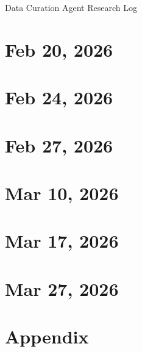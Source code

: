\documentclass{report}
\begin{document}
Data Curation Agent Research Log
\tableofcontents

\chapter{Feb 20, 2026}


\chapter{Feb 24, 2026}


\chapter{Feb 27, 2026}



\chapter{Mar 10, 2026}


\chapter{Mar 17, 2026}


\chapter{Mar 27, 2026}




\appendix
\chapter{Appendix}

\end{document}
